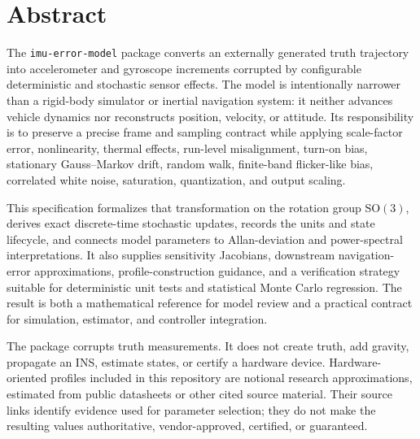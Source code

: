\documentclass[11pt,oneside,headings=big]{scrreprt}
\newcommand{\pkg}{\texttt{imu-error-model}}
\begin{document}
    \chapter*{Abstract}
    The \pkg{} package converts an externally generated truth trajectory into
    accelerometer and gyroscope increments corrupted by configurable deterministic
    and stochastic sensor effects. The model is intentionally narrower than a
    rigid-body simulator or inertial navigation system: it neither advances vehicle
    dynamics nor reconstructs position, velocity, or attitude. Its responsibility is
    to preserve a precise frame and sampling contract while applying scale-factor
    error, nonlinearity, thermal effects, run-level misalignment, turn-on bias,
    stationary Gauss--Markov drift, random walk, finite-band flicker-like bias,
    correlated white noise, saturation, quantization, and output scaling.

    This specification formalizes that transformation on the rotation group
    $\mathrm{SO}(3)$, derives exact discrete-time stochastic updates, records the
    units and state lifecycle, and connects model parameters to Allan-deviation and
    power-spectral interpretations. It also supplies sensitivity Jacobians,
    downstream navigation-error approximations, profile-construction guidance, and
    a verification strategy suitable for deterministic unit tests and statistical
    Monte Carlo regression. The result is both a mathematical reference for model
    review and a practical contract for simulation, estimator, and controller
    integration.

    \begin{boundarybox}
        The package corrupts truth measurements. It does not create truth, add gravity,
        propagate an INS, estimate states, or certify a hardware device. Hardware-oriented
        profiles included in this repository are notional research approximations,
        estimated from public datasheets or other cited source material. Their source
        links identify evidence used for parameter selection; they do not make the
        resulting values authoritative, vendor-approved, certified, or guaranteed.
    \end{boundarybox}

    \tableofcontents
    \listoffigures
    \listoftables
\end{document}
